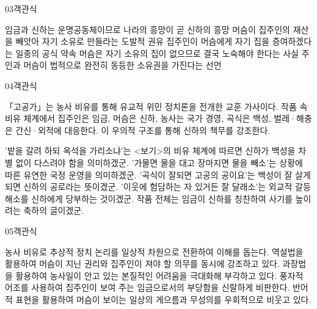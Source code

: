 \documentclass[fs85,seriesWit]{korfarm-base}
\begin{document}
\begin{kfQBlock}{03}{객관식}
\begin{kfChoices}
\kfChoice 임금과 신하는 운명공동체이므로 나라의 흥망이 곧 신하의 흥망
\kfChoice 머슴이 집주인의 재산을 빼앗아 자기 소유로 만들라는 도발적 권유
\kfChoice 집주인이 머슴에게 자기 집을 증여하겠다는 일종의 공식 약속
\kfChoice 머슴은 자기 소유의 집이 없으므로 결국 노숙해야 한다는 사실
\kfChoice 주인과 머슴이 법적으로 완전히 동등한 소유권을 가진다는 선언
\end{kfChoices}
\end{kfQBlock}

\begin{kfQBlock}{04}{객관식}
\begin{kfEvidence}「고공가」는 농사 비유를 통해 유교적 위민 정치론을 전개한 교훈 가사이다. 작품 속 비유 체계에서 집주인은 임금, 머슴은 신하, 농사는 국가 경영, 곡식은 백성, 벌레·해충은 간신·외적에 대응한다. 이 우의적 구조를 통해 신하의 책무를 강조한다.\end{kfEvidence}
\begin{kfChoices}
\kfChoice '밭을 갈려 하되 옥석을 가리소냐'는 <보기>의 비유 체계에 따르면 신하가 백성을 차별 없이 다스려야 함을 의미하겠군.
\kfChoice '가물면 물을 대고 장마지면 물을 빼소'는 상황에 따른 유연한 국정 운영을 의미하겠군.
\kfChoice '곡식이 잘되면 고공의 공이요'는 백성이 잘 살게 되면 신하의 공로라는 뜻이겠군.
\kfChoice '이웃에 험담하는 자 있거든 잘 달래소'는 외교적 갈등 해소를 신하에게 당부하는 것이겠군.
\kfChoice 작품 전체는 임금이 신하를 칭찬하여 사기를 높이려는 축하의 글이겠군.
\end{kfChoices}
\end{kfQBlock}

\begin{kfQBlock}{05}{객관식}
\begin{kfChoices}
\kfChoice 농사 비유로 추상적 정치 논리를 일상적 차원으로 전환하여 이해를 돕는다.
\kfChoice 역설법을 활용하여 머슴이 지닌 권리와 집주인이 져야 할 의무를 동시에 강조하고 있다.
\kfChoice 과장법을 활용하여 농사일이 안고 있는 본질적인 어려움을 극대화해 부각하고 있다.
\kfChoice 풍자적 어조를 사용하여 집주인이 보여 주는 임금으로서의 부당함을 신랄하게 비판한다.
\kfChoice 반어적 표현을 활용하여 머슴이 보이는 일상의 게으름과 무성의를 우회적으로 비웃고 있다.
\end{kfChoices}
\end{kfQBlock}
\end{document}

